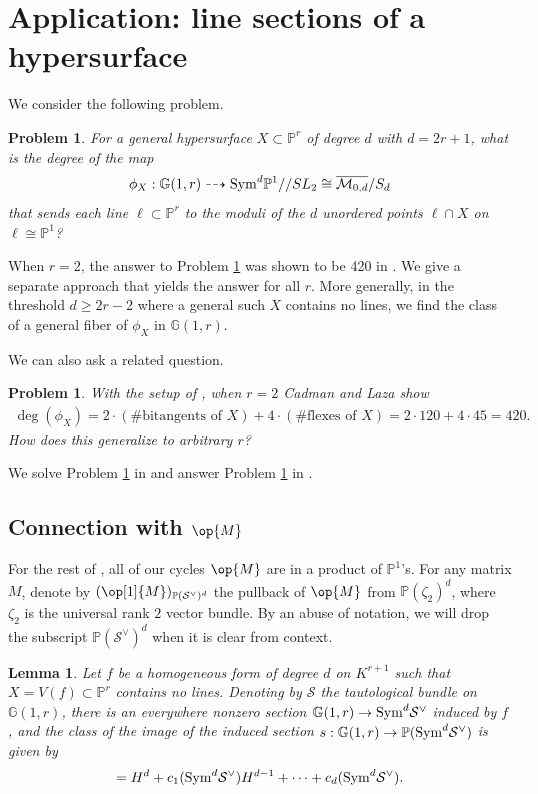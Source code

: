 \documentclass[12pt]{amsart}
\newcommand{\mb}{\mathbb}
\newcommand{\mc}{\mathcal}
\newcommand{\im}{{\rm im}}
\newcommand{\ol}{\overline}
\theoremstyle{plain}
\newtheorem{Pro}[Thm]{Problem}
\newtheorem{Lem}[Thm]{Lemma}
\theoremstyle{definition}
\theoremstyle{remark}
\begin{document}
\section{Application: line sections of a hypersurface}
\label{application}
We consider the following problem.
\begin{Pro}
\label{Patel}
For a general hypersurface $X\subset\mb{P}^r$ of degree $d$ with $d=2r+1$, what is the degree of the map
\begin{align*}
\phi_X: \mb{G}(1,r)\dashrightarrow {\rm Sym}^d\mb{P}^1//SL_2\cong \ol{\mc{M}_{0,d}}/S_d
\end{align*}
that sends each line $\ell\subset \mb{P}^r$ to the moduli of the $d$ unordered points $\ell \cap X$ on $\ell\cong \mb{P}^1$?
\end{Pro}

When $r=2$, the answer to Problem \ref{Patel} was shown to be 420 in \cite{Laza}. We give a separate approach that yields the answer for all $r$. More generally, in the threshold $d\geq 2r-2$ where a general such $X$ contains no lines, we find the class of a general fiber of $\phi_X$ in $\mb{G}(1,r)$. 

We can also ask a related question.
\begin{Pro}
\label{Patel2}
With the setup of , when $r=2$ Cadman and Laza \cite{Laza} show 
\begin{align*}
\deg(\phi_X)= 2\cdot (\text{\# bitangents of $X$})+4\cdot (\text{\# flexes of $X$}) = 2\cdot 120 + 4\cdot 45 = 420.
\end{align*}
How does this generalize to arbitrary $r$? 
\end{Pro}

We solve Problem \ref{Patel} in  and answer Problem \ref{Patel2} in . 

\subsection{Connection with $\op{M}$}
For the rest of , all of our cycles $\op{M}$ are in a product of $\mb{P}^1$'s. For any matrix $M$, denote by $(\op[1]{M})_{\mb{P}(\mc{S}^{\vee})^d}$ the pullback of $\op{M}$ from $\mb{P}(\zeta_2)^d$, where $\zeta_2$ is the universal rank $2$ vector bundle. By an abuse of notation, we will drop the subscript $\mb{P}(\mc{S}^{\vee})^d$ when it is clear from context. 
\begin{Lem}
\label{section}
Let $f$ be a homogeneous form of degree $d$ on $K^{r+1}$ such that $X = V(f) \subset \mb{P}^r$ contains no lines. Denoting by $\mc{S}$ the tautological bundle on $\mb{G}(1,r)$, there is an everywhere nonzero section $\mb{G}(1,r)\to {\rm Sym}^d\mc{S}^\vee$ induced by $f$, and the class of the image of the induced section $s: \mb{G}(1,r)\to \mb{P}({\rm Sym}^d\mc{S}^\vee)$ is given by
\begin{align*}
[\im(s)]=H^{d}+c_1({\rm Sym}^d\mc{S}^\vee)H^{d-1}+\cdots+c_{d}({\rm Sym}^d\mc{S}^\vee).
\end{align*}
\end{Lem}
\end{document}
